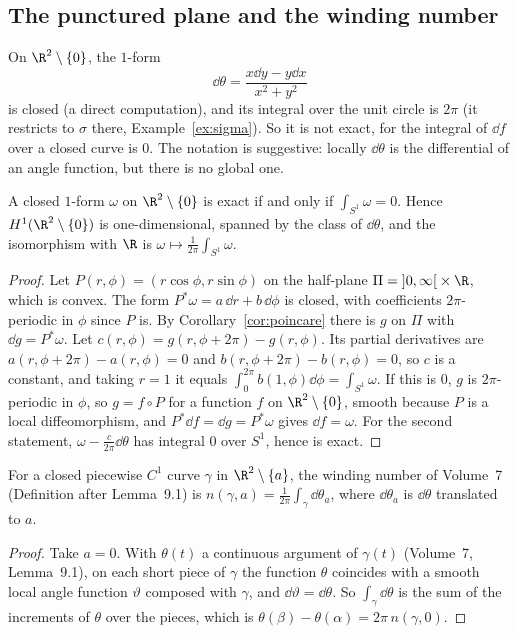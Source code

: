\subsection*{The punctured plane and the winding number}

On $\R^2\setminus\{0\}$, the $1$-form
\[
\dd\theta=\frac{x\dd y-y\dd x}{x^2+y^2}
\]
is closed (a direct computation), and its integral over the unit circle is $2\pi$ (it restricts to $\sigma$ there, Example~\ref{ex:sigma}). So it is not exact,
for the integral of $\dd f$ over a closed curve is $0$. The notation is suggestive: locally $\dd\theta$ is the differential of an angle function, but there is no
global one.

\begin{theorem}\label{thm:h1punctured}
A closed $1$-form $\omega$ on $\R^2\setminus\{0\}$ is exact if and only if $\int_{S^1}\omega=0$. Hence $H^1(\R^2\setminus\{0\})$ is one-dimensional, spanned by the class of
$\dd\theta$, and the isomorphism with $\R$ is $\omega\mapsto\frac1{2\pi}\int_{S^1}\omega$.
\end{theorem}
\begin{proof}
Let $P(r,\phi)=(r\cos\phi,r\sin\phi)$ on the half-plane $\Pi=\left]0,\infty\right[\times\R$, which is convex. The form $P^*\omega=a\,\dd r+b\,\dd\phi$ is closed, with coefficients
$2\pi$-periodic in $\phi$ since $P$ is. By Corollary~\ref{cor:poincare} there is $g$ on $\Pi$ with $\dd g=P^*\omega$. Let $c(r,\phi)=g(r,\phi+2\pi)-g(r,\phi)$. Its partial derivatives
are $a(r,\phi+2\pi)-a(r,\phi)=0$ and $b(r,\phi+2\pi)-b(r,\phi)=0$, so $c$ is a constant, and taking $r=1$ it equals $\int_0^{2\pi}b(1,\phi)\dd\phi=\int_{S^1}\omega$. If this is $0$, $g$ is
$2\pi$-periodic in $\phi$, so $g=f\circ P$ for a function $f$ on $\R^2\setminus\{0\}$, smooth because $P$ is a local diffeomorphism, and $P^*\dd f=\dd g=P^*\omega$ gives $\dd f=\omega$. For
the second statement, $\omega-\frac c{2\pi}\dd\theta$ has integral $0$ over $S^1$, hence is exact.
\end{proof}

\begin{corollary}\label{cor:windingintegral}
For a closed piecewise $C^1$ curve $\gamma$ in $\R^2\setminus\{a\}$, the winding number of Volume~7 (Definition after Lemma~9.1) is
$n(\gamma,a)=\frac1{2\pi}\int_\gamma\dd\theta_a$, where $\dd\theta_a$ is $\dd\theta$ translated to $a$.
\end{corollary}
\begin{proof}
Take $a=0$. With $\theta(t)$ a continuous argument of $\gamma(t)$ (Volume~7, Lemma~9.1), on each short piece of $\gamma$ the function $\theta$ coincides with a smooth local angle
function $\vartheta$ composed with $\gamma$, and $\dd\vartheta=\dd\theta$. So $\int_\gamma\dd\theta$ is the sum of the increments of $\theta$ over the pieces, which is $\theta(\beta)-\theta(\alpha)=2\pi\,n(\gamma,0)$.
\end{proof}

